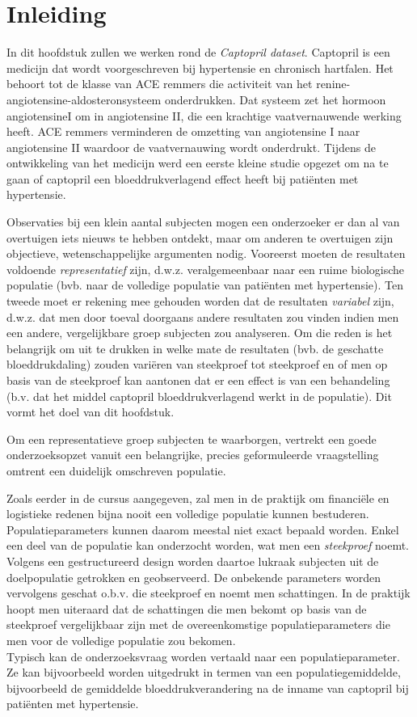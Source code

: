 \documentclass[
  12pt,dutch,coursenotes]{book}
\theoremstyle{definition}
\theoremstyle{definition}
\theoremstyle{definition}
\theoremstyle{definition}
\theoremstyle{remark}
\begin{document}
\hypertarget{inleiding-4}{%
\section{Inleiding}\label{inleiding-4}}

In dit hoofdstuk zullen we werken rond de \emph{Captopril dataset}.
Captopril is een medicijn dat wordt voorgeschreven bij hypertensie en chronisch hartfalen. Het behoort tot de klasse van ACE remmers die activiteit van het renine-angiotensine-aldosteronsysteem onderdrukken. Dat systeem zet het hormoon angiotensineI om in angiotensine II, die een krachtige vaatvernauwende werking heeft. ACE remmers verminderen de omzetting van angiotensine I naar angiotensine II waardoor de vaatvernauwing wordt onderdrukt. Tijdens de ontwikkeling van het medicijn werd een eerste kleine studie opgezet om na te gaan of captopril een bloeddrukverlagend effect heeft bij patiënten met hypertensie.

Observaties bij een klein aantal subjecten mogen een onderzoeker er dan al van overtuigen iets nieuws te hebben ontdekt, maar om anderen te overtuigen zijn objectieve, wetenschappelijke argumenten nodig.
Vooreerst moeten de
resultaten voldoende \emph{representatief} zijn, d.w.z. veralgemeenbaar
naar een ruime biologische populatie (bvb. naar de volledige populatie van patiënten met hypertensie).
Ten tweede moet er rekening mee gehouden worden dat de resultaten \emph{variabel} zijn, d.w.z. dat men
door toeval doorgaans andere resultaten zou vinden indien men een andere, vergelijkbare
groep subjecten zou analyseren.
Om die reden is het belangrijk om uit te drukken in welke mate de resultaten
(bvb. de geschatte bloeddrukdaling) zouden variëren van steekproef tot steekproef en of men op basis van de steekproef kan aantonen dat er een effect is van een behandeling (b.v. dat het middel captopril bloeddrukverlagend werkt in de populatie).
Dit vormt het doel van dit hoofdstuk.

Om een representatieve groep subjecten te waarborgen, vertrekt een goede
onderzoeksopzet vanuit een belangrijke, precies geformuleerde vraagstelling
omtrent een duidelijk omschreven populatie.

Zoals eerder in de cursus aangegeven, zal men in de praktijk om financiële en logistieke redenen bijna nooit een
volledige populatie kunnen bestuderen.
Populatieparameters kunnen daarom meestal
niet exact bepaald worden. Enkel een deel van de populatie kan onderzocht
worden, wat men een \emph{steekproef} noemt. Volgens een
gestructureerd design worden daartoe lukraak subjecten uit de doelpopulatie
getrokken en geobserveerd. De onbekende parameters worden vervolgens geschat
o.b.v. die steekproef en noemt men schattingen. In de praktijk hoopt men uiteraard dat de schattingen die men bekomt op basis van de steekproef vergelijkbaar zijn met de overeenkomstige populatieparameters die men voor de volledige populatie zou bekomen.\\
Typisch kan de onderzoeksvraag worden vertaald naar een populatieparameter.
Ze kan bijvoorbeeld worden uitgedrukt in termen van een populatiegemiddelde, bijvoorbeeld de gemiddelde bloeddrukverandering na de inname van captopril bij patiënten met hypertensie.
\end{document}
